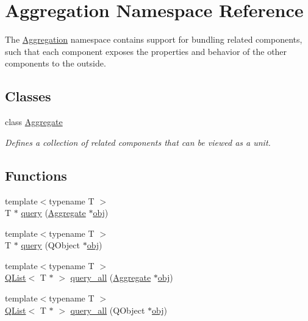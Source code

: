 \hypertarget{namespace_aggregation}{\section{Aggregation Namespace Reference}
\label{namespace_aggregation}
}


The \hyperlink{namespace_aggregation}{Aggregation} namespace contains support for bundling related components, such that each component exposes the properties and behavior of the other components to the outside.  


\subsection*{Classes}
\begin{DoxyCompactItemize}
\item 
class \hyperlink{class_aggregation_1_1_aggregate}{Aggregate}
\begin{DoxyCompactList}\small\item\em Defines a collection of related components that can be viewed as a unit. \end{DoxyCompactList}\end{DoxyCompactItemize}
\subsection*{Functions}
\begin{DoxyCompactItemize}
\item 
{\footnotesize template$<$typename T $>$ }\\T $\ast$ \hyperlink{namespace_aggregation_a1b5f85f4af221459c037427c41e18d98}{query} (\hyperlink{class_aggregation_1_1_aggregate}{Aggregate} $\ast$\hyperlink{glext_8h_a0c0d4701a6c89f4f7f0640715d27ab26}{obj})
\item 
{\footnotesize template$<$typename T $>$ }\\T $\ast$ \hyperlink{namespace_aggregation_ad92024df426e336ab0a3e52683eaf346}{query} (Q\-Object $\ast$\hyperlink{glext_8h_a0c0d4701a6c89f4f7f0640715d27ab26}{obj})
\item 
{\footnotesize template$<$typename T $>$ }\\\hyperlink{class_q_list}{Q\-List}$<$ T $\ast$ $>$ \hyperlink{namespace_aggregation_ab01c7849f973464ac7e9c001161e4965}{query\-\_\-all} (\hyperlink{class_aggregation_1_1_aggregate}{Aggregate} $\ast$\hyperlink{glext_8h_a0c0d4701a6c89f4f7f0640715d27ab26}{obj})
\item 
{\footnotesize template$<$typename T $>$ }\\\hyperlink{class_q_list}{Q\-List}$<$ T $\ast$ $>$ \hyperlink{namespace_aggregation_a85966ec6218e2acb334634407d87f563}{query\-\_\-all} (Q\-Object $\ast$\hyperlink{glext_8h_a0c0d4701a6c89f4f7f0640715d27ab26}{obj})
\end{DoxyCompactItemize}


